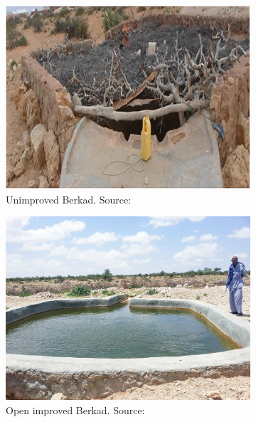 \begin{figure}[!hbp]
    \centering
    \begin{subfigure}[t]{0.3\linewidth}
        \centering\includegraphics[width=0.95\linewidth]{figures/2023_MA_th_berkad_unimproved.PNG}
        \caption{Unimproved Berkad. Source: \textcite[5]{mafutaUniversalWASHCoverage2021}}
    \end{subfigure}
    \begin{subfigure}[t]{0.3\linewidth}
        \centering\includegraphics[width=0.95\linewidth]{figures/2023_MA_th_berkad_open.jpg}
        \caption{Open improved Berkad. Source: \textcite{lifeLIFEWorksLocal2017}}
    \end{subfigure}
    \begin{subfigure}[t]{0.3\linewidth}

\end{subfigure}
\end{figure}
